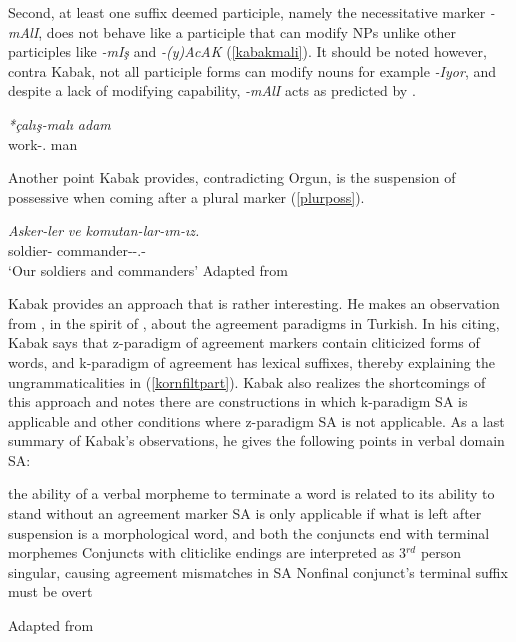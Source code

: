 Second, at least one suffix deemed participle, namely the necessitative marker \textit{-mAlI}, does not behave like a participle that can modify NPs unlike other participles like \textit{-mIş} and \textit{-(y)AcAK} (\ref{kabakmali}). It should be noted however, contra Kabak, not all participle forms can modify nouns for example \textit{-Iyor}, and despite a lack of modifying capability, \textit{-mAlI} acts as predicted by \cite{kornfilt1996some}.
\begin{exe}
    \ex \label{kabakmali}
    \gll 
    \textit{*çalış-malı} \textit{adam} \\ work-{\Nec}. man \\
\end{exe}

Another point Kabak provides, contradicting Orgun, is the suspension of possessive when coming after a plural marker (\ref{plurposs}).

\begin{exe}
    \ex \label{plurposs}
    \gll
    \textit{Asker-ler} \textit{ve} \textit{komutan-lar-ım-ız.} \\ soldier-{\Pl} {\And} commander-{\Pl}-{\Poss}.{\First}-{\Pl} \\
    \glt `Our soldiers and commanders'
    \hfill Adapted from \cite{kabak2007turkish}
\end{exe}

Kabak provides an approach that is rather interesting. He makes an observation from \cite{good2005morphosyntax}, in the spirit of \cite{erdal2000clitics}, about the agreement paradigms in Turkish. In his citing, Kabak says that z-paradigm of agreement markers contain cliticized forms of words, and k-paradigm of agreement has lexical suffixes, thereby explaining the ungrammaticalities in (\ref{kornfiltpart}). Kabak also realizes the shortcomings of this approach and notes there are constructions in which k-paradigm SA is applicable and other conditions where z-paradigm SA is not applicable. As a last summary of Kabak's observations, he gives the following points in verbal domain SA:
\begin{exe}
\sn \begin{xlisti}
    \ex the ability of a verbal morpheme to terminate a word is related to its ability to stand without an agreement marker
    \ex SA is only applicable if what is left after suspension is a morphological word, and both the conjuncts end with terminal morphemes
    \ex Conjuncts with cliticlike endings are interpreted as 3$^{rd}$ person singular, causing agreement mismatches in SA
    \ex Nonfinal conjunct's terminal suffix must be overt
    \end{xlisti}
    \hfill Adapted from \cite{kabak2007turkish}
\end{exe}

